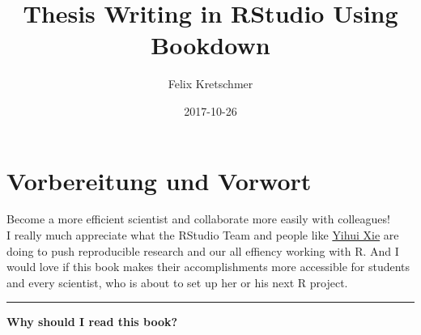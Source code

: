 \documentclass[]{book}
\title{Thesis Writing in RStudio Using Bookdown}
\author{Felix Kretschmer}
\date{2017-10-26}
\theoremstyle{definition}
\theoremstyle{definition}
\theoremstyle{remark}
\begin{document}
\maketitle

{
\setcounter{tocdepth}{1}
\tableofcontents
}
\listoftables
\listoffigures
\chapter*{Vorbereitung und Vorwort}\label{vorbereitung-und-vorwort}

Become a more efficient scientist and collaborate more easily with
colleagues!\\
I really much appreciate what the RStudio Team and people like
\href{https://yihui.name/}{Yihui Xie} are doing to push reproducible
research and our all effiency working with R. And I would love if this
book makes their accomplishments more accessible for students and every
scientist, who is about to set up her or his next R project.

\begin{center}\rule{0.5\linewidth}{\linethickness}\end{center}

\textbf{Why should I read this book?}
\end{document}
